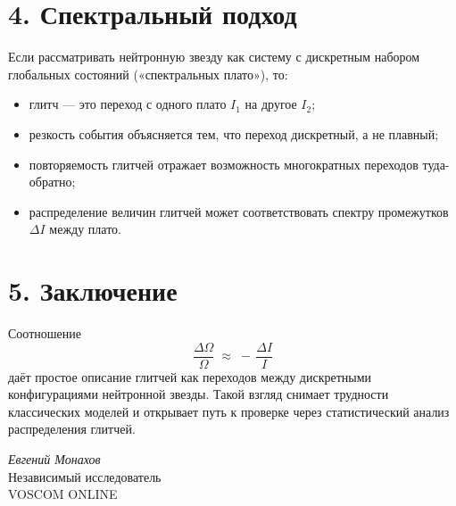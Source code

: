 \documentclass[a4paper,12pt]{article}
\begin{document}
\section*{4. Спектральный подход}
Если рассматривать нейтронную звезду как систему с дискретным набором глобальных состояний («спектральных плато»), то:
\begin{itemize}
  \item глитч --- это переход с одного плато $I_1$ на другое $I_2$;
  \item резкость события объясняется тем, что переход дискретный, а не плавный;
  \item повторяемость глитчей отражает возможность многократных переходов туда-обратно;
  \item распределение величин глитчей может соответствовать спектру промежутков $\Delta I$ между плато.
\end{itemize}

\section*{5. Заключение}
Соотношение
\[
\frac{\Delta \Omega}{\Omega} \;\approx\; -\, \frac{\Delta I}{I}
\]
даёт простое описание глитчей как переходов между дискретными конфигурациями нейтронной звезды. Такой взгляд снимает трудности классических моделей и открывает путь к проверке через статистический анализ распределения глитчей.

\vspace{2em}
\noindent
\textit{Евгений Монахов} \\
Независимый исследователь \\
VOSCOM ONLINE
\end{document}

